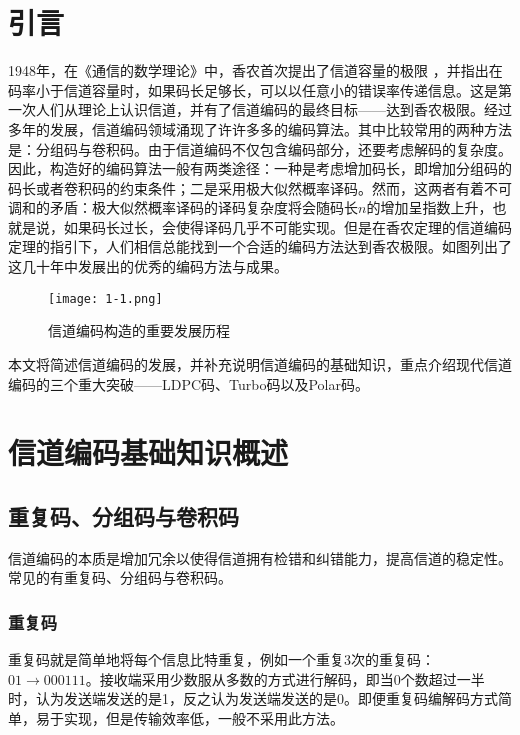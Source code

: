 \documentclass{article}
\title{\centering{信道编码的最新进展}}
\author{张嘉伟，杨筠松}
\date{\today}
\begin{document}
\maketitle
\thispagestyle{empty} %
\newpage

\tableofcontents
\newpage

\section{引言}
1948年，在《通信的数学理论》中，香农首次提出了信道容量的极限 \cite{shannon1948}，并指出在码率小于信道容量时，如果码长足够长，可以以任意小的错误率传递信息。这是第一次人们从理论上认识信道，并有了信道编码的最终目标——达到香农极限。经过多年的发展，信道编码领域涌现了许许多多的编码算法。其中比较常用的两种方法是：分组码与卷积码。由于信道编码不仅包含编码部分，还要考虑解码的复杂度。因此，构造好的编码算法一般有两类途径：一种是考虑增加码长，即增加分组码的码长或者卷积码的约束条件；二是采用极大似然概率译码。然而，这两者有着不可调和的矛盾：极大似然概率译码的译码复杂度将会随码长$n$的增加呈指数上升，也就是说，如果码长过长，会使得译码几乎不可能实现。但是在香农定理的信道编码定理的指引下，人们相信总能找到一个合适的编码方法达到香农极限。如图列出了这几十年中发展出的优秀的编码方法与成果。
\cite{yu2018channel}

\begin{figure}[h]
  \centering
  \texttt{[image: 1-1.png]}
  \caption{信道编码构造的重要发展历程}
\end{figure}

本文将简述信道编码的发展，并补充说明信道编码的基础知识，重点介绍现代信道编码的三个重大突破——LDPC码、Turbo码以及Polar码。

\section{信道编码基础知识概述}
\subsection{重复码、分组码与卷积码}
信道编码的本质是增加冗余以使得信道拥有检错和纠错能力，提高信道的稳定性。常见的有重复码、分组码与卷积码。
\subsubsection{重复码}
重复码就是简单地将每个信息比特重复，例如一个重复3次的重复码：$01\to000111$。接收端采用少数服从多数的方式进行解码，即当0个数超过一半时，认为发送端发送的是1，反之认为发送端发送的是0。即便重复码编解码方式简单，易于实现，但是传输效率低，一般不采用此方法。
\end{document}
